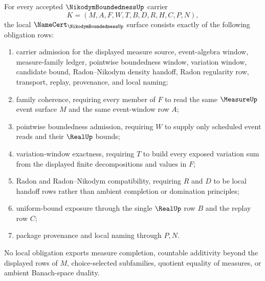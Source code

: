 \begin{theorem}
\label{thm:nikodym-boundedness-namecert-obligations}
For every accepted $\NikodymBoundednessUp$ carrier
$$
K=(M,A,F,W,T,B,D,R,H,C,P,N),
$$
the local $\NameCert_{\NikodymBoundednessUp}$ surface consists exactly of the following obligation rows:
\begin{enumerate}
\item carrier admission for the displayed measure source, event-algebra window, measure-family ledger, pointwise boundedness window, variation window, candidate bound, Radon--Nikodym density handoff, Radon regularity row, transport, replay, provenance, and local naming;
\item family coherence, requiring every member of $F$ to read the same $\MeasureUp$ event surface $M$ and the same event-window row $A$;
\item pointwise boundedness admission, requiring $W$ to supply only scheduled event reads and their $\RealUp$ bounds;
\item variation-window exactness, requiring $T$ to build every exposed variation sum from the displayed finite decompositions and values in $F$;
\item Radon and Radon--Nikodym compatibility, requiring $R$ and $D$ to be local handoff rows rather than ambient completion or domination principles;
\item uniform-bound exposure through the single $\RealUp$ row $B$ and the replay row $C$;
\item package provenance and local naming through $P,N$.
\end{enumerate}
No local obligation exports measure completion, countable additivity beyond the displayed rows of $M$, choice-selected subfamilies, quotient equality of measures, or ambient Banach-space duality.
\end{theorem}
